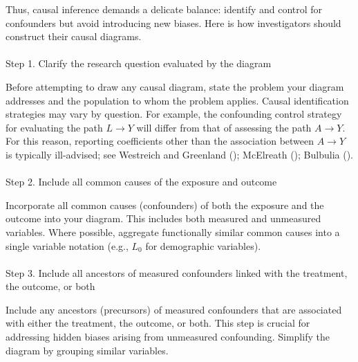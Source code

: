 \documentclass[
  single column]{article}
\makeatletter
\let\oldparagraph\paragraph
\renewcommand{\paragraph}{
    \@ifstar
      \xxxParagraphStar
      \xxxParagraphNoStar
  }
\newcommand{\xxxParagraphStar}[1]{\oldparagraph*{#1}\mbox{}}
\newcommand{\xxxParagraphNoStar}[1]{\oldparagraph{#1}\mbox{}}
\makeatother
\begin{document}
Thus, causal inference demands a delicate balance: identify and control
for confounders but avoid introducing new biases. Here is how
investigators should construct their causal diagrams.

\paragraph{Step 1. Clarify the research question evaluated by the
diagram}\label{step-1.-clarify-the-research-question-evaluated-by-the-diagram}

Before attempting to draw any causal diagram, state the problem your
diagram addresses and the population to whom the problem applies. Causal
identification strategies may vary by question. For example, the
confounding control strategy for evaluating the path \(L\to Y\) will
differ from that of assessing the path \(A\to Y\). For this reason,
reporting coefficients other than the association between \(A \to Y\) is
typically ill-advised; see Westreich and Greenland
(); McElreath
(); Bulbulia
().

\paragraph{Step 2. Include all common causes of the exposure and
outcome}\label{step-2.-include-all-common-causes-of-the-exposure-and-outcome}

Incorporate all common causes (confounders) of both the exposure and the
outcome into your diagram. This includes both measured and unmeasured
variables. Where possible, aggregate functionally similar common causes
into a single variable notation (e.g., \(L_0\) for demographic
variables).

\paragraph{Step 3. Include all ancestors of measured confounders linked
with the treatment, the outcome, or
both}\label{step-3.-include-all-ancestors-of-measured-confounders-linked-with-the-treatment-the-outcome-or-both}

Include any ancestors (precursors) of measured confounders that are
associated with either the treatment, the outcome, or both. This step is
crucial for addressing hidden biases arising from unmeasured
confounding. Simplify the diagram by grouping similar variables.
\end{document}
